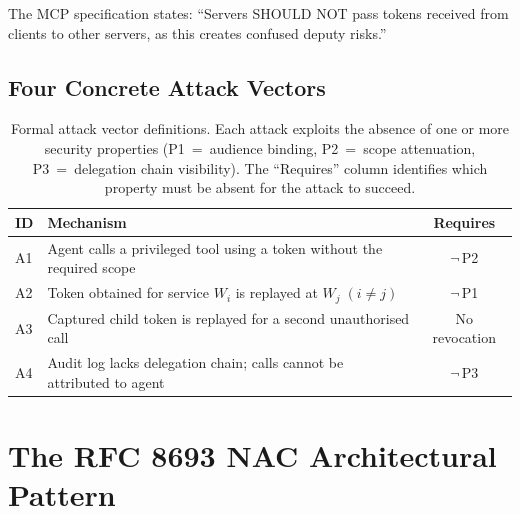 \documentclass[journal]{IEEEtran}
\begin{document}
The MCP specification \cite{mcp_security} states: ``Servers SHOULD NOT pass
tokens received from clients to other servers, as this creates confused deputy
risks.''

\subsection{Four Concrete Attack Vectors}

\begin{table}[h]
\caption{Formal attack vector definitions. Each attack exploits the absence of
one or more security properties (P1~=~audience binding, P2~=~scope attenuation,
P3~=~delegation chain visibility). The ``Requires'' column identifies which
property must be absent for the attack to succeed.}
\label{tab:attack_formal}
\centering
\footnotesize
\setlength{\tabcolsep}{3pt}
\begin{tabularx}{\columnwidth}{l X c}
\toprule
\textbf{ID} & \textbf{Mechanism} & \textbf{Requires} \\
\midrule
A1 & Agent calls a privileged tool using a token without the required scope
     & $\neg$\,P2 \\
A2 & Token obtained for service $W_i$ is replayed at $W_j\;(i\neq j)$
     & $\neg$\,P1 \\
A3 & Captured child token is replayed for a second unauthorised call
     & No revocation \\
A4 & Audit log lacks delegation chain; calls cannot be attributed to agent
     & $\neg$\,P3 \\
\bottomrule
\end{tabularx}
\end{table}


\section{The RFC 8693 NAC Architectural Pattern}
\label{sec:solution}
\end{document}
